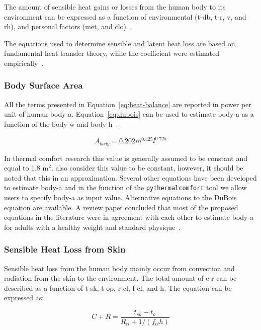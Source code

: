 The amount of sensible heat gains or losses from the human body to its environment can be expressed as a function of environmental (\ac{t-db}, \ac{t-r}, \ac{v}, and \ac{rh}), and personal factors (\ac{met}, and \ac{clo})~\cite{ASHRA2017}.

The equations used to determine sensible and latent heat loss are based on fundamental heat transfer theory, while the coefficient were estimated empirically~\cite{ASHRA2017}.

\subsubsection{Body Surface Area}

All the terms presented in Equation~\ref{eq:heat-balance} are reported in power per unit of human \ac{body-a}.
Equation~\ref{eq:dubois} can be used to estimate \ac{body-a} as a function of the \ac{body-w} and \ac{body-h}~\cite{DuBois}.

\begin{equation}
    A_{body} = 0.202 m^{0.425} l^{0.725}\label{eq:dubois}
\end{equation}

In thermal comfort research this value is generally assumed to be constant and equal to 1.8 m$^{2}$.
 also consider this value to be constant, however, it should be noted that this in an approximation.
Several other equations have been developed to estimate \ac{body-a} and in the function of the \verb|pythermalcomfort| tool we allow users to specify \ac{body-a} as input value.
Alternative equations to the DuBois equation are available.
A review paper concluded that most of the proposed equations in the literature were in agreement with each other to estimate \ac{body-a} for adults with a healthy weight and standard physique~\cite{Redlarski2016}.

\subsubsection{Sensible Heat Loss from Skin}

Sensible heat loss from the human body mainly occur from convection and radiation from the skin to the environment.
The total amount of \ac{c-r} can be described as a function of \ac{t-sk}, \ac{t-op}, \ac{r-cl}, \ac{f-cl}, and \ac{h}.
The equation can be expressed as:

\begin{equation}
    C+R=\frac{t_{s k}-t_{o}}{R_{c l}+1 /\left(f_{c l} h\right)}\label{eq:c-r}
\end{equation}


